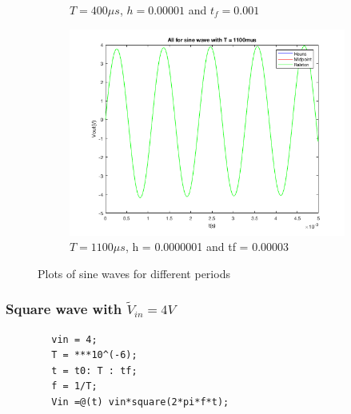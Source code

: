 \documentclass[11pt,a4paper]{article}
\begin{document}
\begin{figure}[h]
\begin{subfigure}{.5\textwidth}
\caption{$T = 400\mu s$,  $h = 0.00001$ and $t_f = 0.001$}
\label{fig:sfig3}
\end{subfigure}
\begin{subfigure}{0.5\textwidth}
\centering
\includegraphics[width=.8\linewidth]{Ex1_Figs/allsine1100.png}
\caption{$T = 1100\mu s$,  h = 0.0000001 and tf = 0.00003}
\label{fig:sfig4}
\end{subfigure}
\caption{Plots of sine waves for different periods}
\label{fig:test4}
\end{figure}




\FloatBarrier
\newpage
\subsubsection {Square wave with $\tilde{V}_{in} = 4V$}
   \begin{verbatim}
        vin = 4;
        T = ***10^(-6);
        t = t0: T : tf;
        f = 1/T;
        Vin =@(t) vin*square(2*pi*f*t);
    \end{verbatim}
\end{document}
